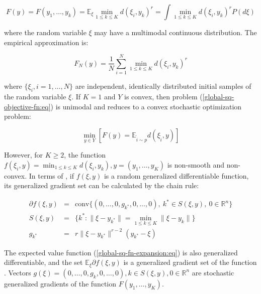 \begin{equation}
    \label{smooth-stoch-fn-expansion:eq}
        F(y) = F(y_1, \ldots, y_k) = \mathbb{E}_{\xi} \min_{1 \leq k \leq K} d(\xi_i, y_k)^r = \int \min_{1 \leq k \leq K} d(\xi_i, y_k)^r P(d \xi)
\end{equation}

\noindent where the random variable $\xi$ may have a multimodal continuous distribution. The empirical approximation is:

\begin{equation}
    \label{empirical-stoch-fn-expansion:eq}
        F_N(y) = \frac{1}{N} \sum_{i=1}^N \min_{1 \leq k \leq K} d(\xi_i, y_k)^r
\end{equation}

\noindent where $\{\xi_i, i = 1, \ldots, N\}$ are independent, identically distributed initial samples of the random variable $\xi$. If $K = 1$ and $Y$ is convex, then problem (\ref{global-sq-objective-fn:eq}) is unimodal and reduces to a convex stochastic optimization problem:

\begin{equation}
    \label{convex-stoch-opt-problem:eq}
        \min_{y \in Y} [ F(y) =  \mathbb{E}_{\tilde{i} \sim p} d(\xi_{\tilde{i}}, y) ]
\end{equation}

However, for $K \geq 2$, the function $f(\xi_i, y) = \min_{1 \leq k \leq K} d(\xi_i, y_k), y = (y_1, \ldots, y_K)$ is non-smooth and non-convex. In terms of \cite{mikhalevich2024,Norkin_1986}, if $f(\xi, y)$ is a random generalized differentiable function, its generalized gradient set can be calculated by the chain rule:

\begin{eqnarray}
    \label{sq-objective-fn-gradient:eq}
        \partial f(\xi, y) &=& \text{conv} \{ (0, \ldots, 0, g_{k^*}, 0, \ldots, 0), \> k^* \in S(\xi, y), \> 0 \in \mathbb{R}^n \} \nonumber \\
        S(\xi, y) &=& \{ k^*: \| \xi - y_{k^*} \| = \min_{1 \leq k \leq K} \| \xi - y_k \| \} \nonumber \\
        g_{k^*} &=& r \| \xi - y_{k^*} \|^{r - 2} (y_{k^*} - \xi)
\end{eqnarray}

The expected value function (\ref{global-sq-fn-expansion:eq}) is also generalized differentiable, and the set $\mathbb{E}_{\xi} \partial f(\xi, y)$ is a generalized gradient set of the function \cite{mikhalevich2024,Norkin_1986}. Vectors $g(\xi) = (0, \ldots, 0, g_k, 0, \ldots, 0), k \in S(\xi, y), 0 \in \mathbb{R}^n$ are stochastic generalized gradients of the function $F(y_1, \ldots, y_K)$.

